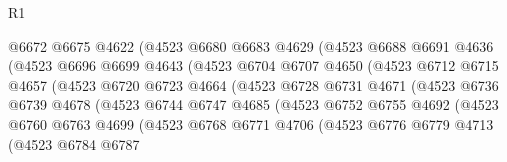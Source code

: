 \begin{lexlean}{R1}
\begin{coremodule}
                          @6672
                          @6675
                          @4622
                          (@4523
                            @6680
                            @6683
                            @4629
                            (@4523
                              @6688
                              @6691
                              @4636
                              (@4523
                                @6696
                                @6699
                                @4643
                                (@4523
                                  @6704
                                  @6707
                                  @4650
                                  (@4523
                                    @6712
                                    @6715
                                    @4657
                                    (@4523
                                      @6720
                                      @6723
                                      @4664
                                      (@4523
                                        @6728
                                        @6731
                                        @4671
                                        (@4523
                                          @6736
                                          @6739
                                          @4678
                                          (@4523
                                            @6744
                                            @6747
                                            @4685
                                            (@4523
                                              @6752
                                              @6755
                                              @4692
                                              (@4523
                                                @6760
                                                @6763
                                                @4699
                                                (@4523
                                                  @6768
                                                  @6771
                                                  @4706
                                                  (@4523
                                                    @6776
                                                    @6779
                                                    @4713
                                                    (@4523
                                                      @6784
                                                      @6787

\end{coremodule}
\end{lexlean}
